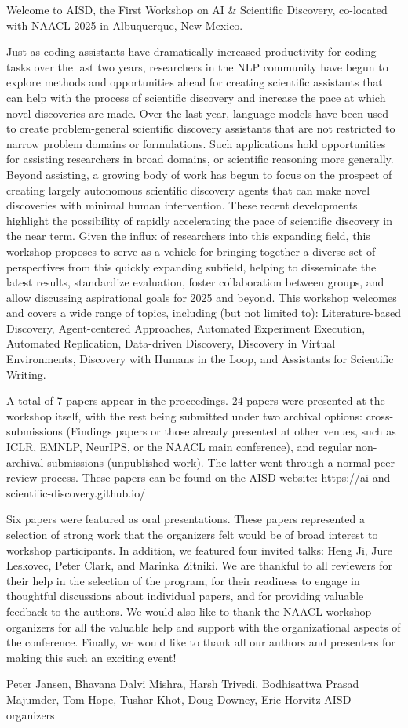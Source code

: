 Welcome to AISD, the First Workshop on AI & Scientific Discovery, co-located with NAACL 2025 in Albuquerque, New Mexico.

Just as coding assistants have dramatically increased productivity for coding tasks over the last two years, researchers in the NLP community have begun to explore methods and opportunities ahead for creating scientific assistants that can help with the process of scientific discovery and increase the pace at which novel discoveries are made. Over the last year, language models have been used to create problem-general scientific discovery assistants that are not restricted to narrow problem domains or formulations. Such applications hold opportunities for assisting researchers in broad domains, or scientific reasoning more generally. Beyond assisting, a growing body of work has begun to focus on the prospect of creating largely autonomous scientific discovery agents that can make novel discoveries with minimal human intervention.
These recent developments highlight the possibility of rapidly accelerating the pace of scientific discovery in the near term. Given the influx of researchers into this expanding field, this workshop proposes to serve as a vehicle for bringing together a diverse set of perspectives from this quickly expanding subfield, helping to disseminate the latest results, standardize evaluation, foster collaboration between groups, and allow discussing aspirational goals for 2025 and beyond. This workshop welcomes and covers a wide range of topics, including (but not limited to): Literature-based Discovery, Agent-centered Approaches, Automated Experiment Execution, Automated Replication, Data-driven Discovery, Discovery in Virtual Environments, Discovery with Humans in the Loop, and Assistants for Scientific Writing.

A total of 7 papers appear in the proceedings. 24 papers were presented at the workshop itself, with the rest being submitted under two archival options: cross-submissions (Findings papers or those already presented at other venues, such as ICLR, EMNLP, NeurIPS, or the NAACL main conference), and regular non-archival submissions (unpublished work). The latter went through a normal peer review process. These papers can be found on the AISD website: https://ai-and-scientific-discovery.github.io/

Six papers were featured as oral presentations. These papers represented a selection of strong work that the organizers felt would be of broad interest to workshop participants. In addition, we featured four invited talks: Heng Ji, Jure Leskovec, Peter Clark, and Marinka Zitniki.
We are thankful to all reviewers for their help in the selection of the program, for their readiness to engage in thoughtful discussions about individual papers, and for providing valuable feedback to the authors. We would also like to thank the NAACL workshop organizers for all the valuable help and support with the organizational aspects of the conference. Finally, we would like to thank all our authors and presenters for making this such an exciting event!

Peter Jansen, Bhavana Dalvi Mishra, Harsh Trivedi, Bodhisattwa Prasad Majumder, Tom Hope, Tushar Khot, Doug Downey, Eric Horvitz
AISD organizers